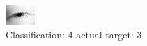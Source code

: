 \begin{figure}[h!]
\begin{center}
\includegraphics[width=0.60\columnwidth]{figures/ID103_class_4_target_3.png}
\end{center}
\caption{ Classification: 4 actual target: 3}
\label{fig:ID103_class_4_target_3}
\end{figure}
